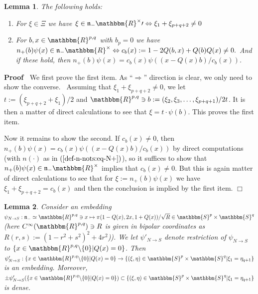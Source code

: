 \documentclass{article}
\newcommand{\assign}{:=}
\newenvironment{proof}{\noindent\textbf{Proof\ }}{\hspace*{\fill}$\Box$\medskip}
\numberwithin{definition}{section}
\newtheorem{lemma}{Lemma}
\numberwithin{lemma}{section}
\numberwithin{proposition}{section}
{\theorembodyfont{\rmfamily}\newtheorem{remark}{Remark}
\numberwithin{remark}{section}
}
\begin{document}
\begin{lemma}
  \label{k-finite:lem-compat-N-aux}The following holds:
  \begin{enumerate}
    \item For $\xi \in \Xi$ we have $\xi \in \mathfrak{n}_-
    \mathbbm{R}^{\times}\prime \Leftrightarrow \xi_1 + \xi_{p + q + 2} \neq 0$
    
    \item For $b, x \in \mathbbm{R}^{p, q}$ with $b_p = 0$ we have $n_+ ( b)
    \psi ( x) \in \mathfrak{n}_- \mathbbm{R}^{\times} \Leftrightarrow c_b ( x)
    \assign 1 - 2 Q ( b, x) + Q ( b) Q ( x) \neq 0.$ And if these hold, then
    $n_+ ( b) \psi ( x) = c_b ( x) \psi ( ( x - Q ( x) b) / c_b ( x))$.
  \end{enumerate}
\end{lemma}

\begin{proof}
  We first prove the first item. As ``$\Rightarrow$'' direction is clear, we
  only need to show the converse. \ Assuming that $\xi_1 + \xi_{p + q + 2}
  \neq 0$, we let $t \assign ( \xi_{p + q + 2} + \xi_1) / 2$ and
  $\mathbbm{R}^{p, q} \ni b \assign ( \xi_2, \xi_3, \ldots, \xi_{p + q + 1}) /
  2 t$. It is then a matter of direct calculations to see that $\xi = t \cdot
  \psi ( b)$. This proves the first item.
  
  Now it remains to show the second. If $c_b ( x) \neq 0$, then $n_+ ( b) \psi
  ( x) = c_b ( x) \psi ( ( x - Q ( x) b) / c_b ( x))$ by direct computations
  (with $n ( \cdot)$ as in $( \ref{def-n-nots:eq-N+})$), so it suffices to
  show that $n_+ ( b) \psi ( x) \in \mathfrak{n}_- \mathbbm{R}^{\times}$
  implies that $c_b ( x) \neq 0$. But this is again matter of direct
  calculations to see that for $\xi \assign n_+ ( b) \psi ( x)$ we have $\xi_1
  + \xi_{p + q + 2} = c_b ( x)$ and then the conclusion is implied by the
  first item.
\end{proof}

\begin{lemma}
  \label{k-finite:lem-restr-opendense}Consider an embedding $\psi_{N
  \rightarrow S} : \mathfrak{n}_- \simeq \mathbbm{R}^{p, q} \ni x \mapsto \pi
  ( 1 - Q ( x), 2 x, 1 + Q ( x)) / \sqrt{R} \in \mathbbm{S}^p \times
  \mathbbm{S}^q$ (here $C^{\infty} ( \mathbbm{R}^{p, q}) \ni R$ is given in
  bipolar coordinates as $R ( r, s) \assign ( 1 - r^2 + s^2)^2 + 4 r^2$)). We
  let $\psi'_{N \rightarrow S}$ denote restriction of $\psi_{N \rightarrow S}$
  to $\{ x \in \mathbbm{R}^{p, q} \backslash \{ 0 \} | Q ( x) = 0 \}$. Then
  $\psi'_{N \rightarrow S} : \{ x \in \mathbbm{R}^{p, q} \backslash \{ 0 \} |
  Q ( x) = 0 \} \rightarrow \{ ( \xi, \eta) \in \mathbbm{S}^p \times
  \mathbbm{S}^q | \xi_1 = \eta_{q + 1} \}$ is an embedding. Moreover, $\pm
  \psi'_{N \rightarrow S} ( \{ x \in \mathbbm{R}^{p, q} \backslash \{ 0 \} | Q
  ( x) = 0 \}) \subset \{ ( \xi, \eta) \in \mathbbm{S}^p \times \mathbbm{S}^q
  | \xi_1 = \eta_{q + 1} \}$ is dense.
\end{lemma}
\end{document}
